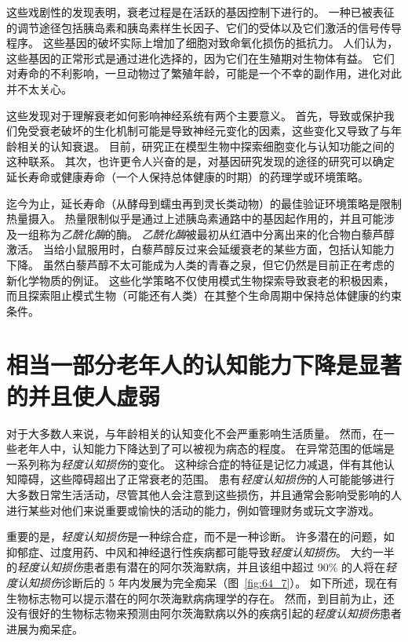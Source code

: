 这些戏剧性的发现表明，衰老过程是在活跃的基因控制下进行的。
一种已被表征的调节途径包括胰岛素和胰岛素样生长因子、它们的受体以及它们激活的信号传导程序。
这些基因的破坏实际上增加了细胞对致命氧化损伤的抵抗力。
人们认为，这些基因的正常形式是通过进化选择的，因为它们在生殖期对生物体有益。
它们对寿命的不利影响，一旦动物过了繁殖年龄，可能是一个不幸的副作用，进化对此并不太关心。


这些发现对于理解衰老如何影响神经系统有两个主要意义。
首先，导致或保护我们免受衰老破坏的生化机制可能是导致神经元变化的因素，这些变化又导致了与年龄相关的认知衰退。
目前，研究正在模型生物中探索细胞变化与认知功能之间的这种联系。
其次，也许更令人兴奋的是，对基因研究发现的途径的研究可以确定延长寿命或健康寿命（一个人保持总体健康的时期）的药理学或环境策略。


迄今为止，延长寿命（从酵母到蠕虫再到灵长类动物）的最佳验证环境策略是限制热量摄入。
热量限制似乎是通过上述胰岛素通路中的基因起作用的，并且可能涉及一组称为\textit{乙酰化酶}的酶。
\textit{乙酰化酶}被最初从红酒中分离出来的化合物白藜芦醇激活。
当给小鼠服用时，白藜芦醇反过来会延缓衰老的某些方面，包括认知能力下降。
虽然白藜芦醇不太可能成为人类的青春之泉，但它仍然是目前正在考虑的新化学物质的例证。
这些化学策略不仅使用模式生物探索导致衰老的积极因素，而且探索阻止模式生物（可能还有人类）在其整个生命周期中保持总体健康的约束条件。



\section{相当一部分老年人的认知能力下降是显著的并且使人虚弱}

对于大多数人来说，与年龄相关的认知变化不会严重影响生活质量。
然而，在一些老年人中，认知能力下降达到了可以被视为病态的程度。
在异常范围的低端是一系列称为\textit{轻度认知损伤}的变化。
这种综合症的特征是记忆力减退，伴有其他认知障碍，这些障碍超出了正常衰老的范围。
患有\textit{轻度认知损伤}的人可能能够进行大多数日常生活活动，尽管其他人会注意到这些损伤，并且通常会影响受影响的人进行某些对他们来说重要或愉快的活动的能力，例如管理财务或玩文字游戏。


重要的是，\textit{轻度认知损伤}是一种综合症，而不是一种诊断。
许多潜在的问题，如抑郁症、过度用药、中风和神经退行性疾病都可能导致\textit{轻度认知损伤}。
大约一半的\textit{轻度认知损伤}患者患有潜在的阿尔茨海默病，并且该组中超过 90\% 的人将在\textit{轻度认知损伤}诊断后的 5 年内发展为完全痴呆（图~\ref{fig:64_7}）。
如下所述，现在有生物标志物可以提示潜在的阿尔茨海默病病理学的存在。
然而，到目前为止，还没有很好的生物标志物来预测由阿尔茨海默病以外的疾病引起的\textit{轻度认知损伤}患者进展为痴呆症。


